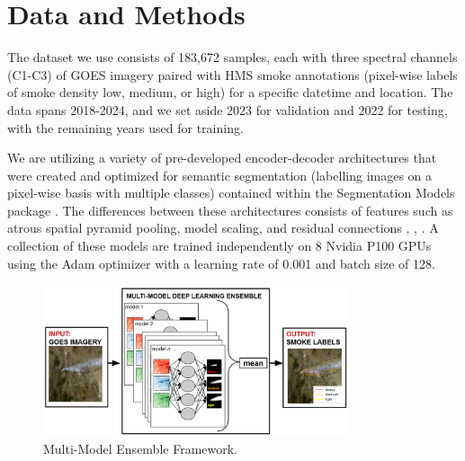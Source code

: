 \documentclass{article}
\begin{document}


\section{Data and Methods}

The dataset we use consists of 183,672 samples, each with three spectral channels (C1-C3) of GOES imagery paired with HMS smoke annotations (pixel-wise labels of smoke density low, medium, or high) for a specific datetime and location. The data spans 2018-2024, and we set aside 2023 for validation and 2022 for testing, with the remaining years used for training. 

We are utilizing a variety of pre-developed encoder-decoder architectures that were created and optimized for semantic segmentation (labelling images on a pixel-wise basis with multiple classes) contained within the Segmentation Models package \citep{semantic}. The differences between these architectures consists of features such as atrous spatial pyramid pooling, model scaling, and residual connections \citep{dlv3p}, \citep{PAN}, \citep{UNetpp}. A collection of these models are trained independently on 8 Nvidia P100 GPUs using the Adam optimizer with a learning rate of 0.001 and batch size of 128. 

\begin{figure}[h]
    \centering
    \includegraphics[width=0.8\textwidth]{ensemble_framework.png}
    \caption{Multi-Model Ensemble Framework.}
    \label{fig:ensemble_framework}
\end{figure}
\end{document}
